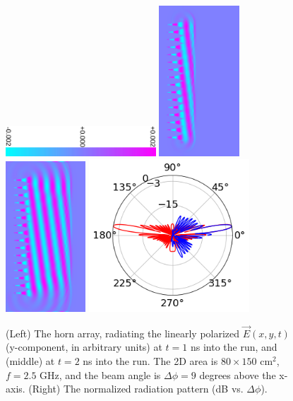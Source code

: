 \documentclass[10pt]{amsart}
\theoremstyle{definition}
\numberwithin{equation}{section}
\begin{document}
\begin{figure}
\centering
\includegraphics[width=5.625cm,angle=90]{figures/fields/colorbar.pdf}
\includegraphics[width=3cm]{figures/fields/ey_phase_horn_t30.png}
\includegraphics[width=3cm]{figures/fields/ey_phase_horn_t60.png}
\includegraphics[width=6cm]{figures/fields/rad_patt_field.png}
\caption{\label{fig:1dhornresults2} (Left) The horn array, radiating the linearly polarized $\vec{E}(x,y,t)$ (y-component, in arbitrary units) at $t = 1$ ns into the run, and (middle) at $t = 2$ ns into the run.  The 2D area is $80 \times 150$ cm$^2$, $f=2.5$ GHz, and the beam angle is $\Delta \phi = 9$ degrees above the x-axis. (Right) The normalized radiation pattern (dB vs. $\Delta \phi$).}
\end{figure}
\end{document}
